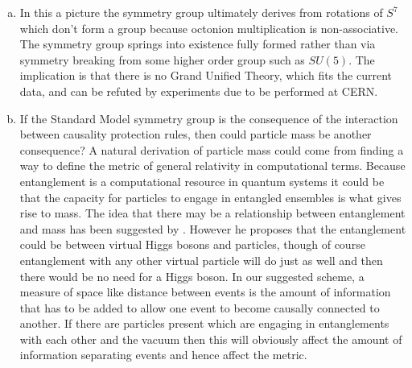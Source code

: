 \documentclass[
   ,final            %
  ]
  {aipproc}
\begin{document}
\begin{enumerate}[(a)]
\item
In this a picture the symmetry group ultimately derives from rotations of $S^7$ which don't form a group because octonion multiplication is %
non-associative. The symmetry group springs into existence fully formed rather than via symmetry breaking from some higher order group such as %
$SU(5)$. The implication is that there is no Grand Unified Theory, which fits the current data, and can be refuted by experiments due to be performed %
at CERN.
\item
If the Standard Model symmetry group is the consequence of the interaction between causality protection rules, then could particle mass be another %
consequence? A natural derivation of particle mass could come from finding a way to define the metric of general relativity in computational terms. %
Because entanglement is a computational resource in quantum systems it could be that the capacity for particles to engage in entangled ensembles is %
what gives rise to mass. The idea that there may be a relationship between entanglement and mass has been suggested by \citet{Vedral_2004}. However he %
proposes that the entanglement could be between virtual Higgs bosons and particles, though of course entanglement with any other virtual particle will %
do just as well and then there would be no need for a Higgs boson. In our suggested scheme, a measure of space like distance between events is the %
amount of information that has to be added to allow one event to become causally connected to another. If there are particles present which are %
engaging in entanglements with each other and the vacuum then this will obviously affect the amount of information separating events and hence affect %
the metric.   
\end{enumerate}
\end{document}
